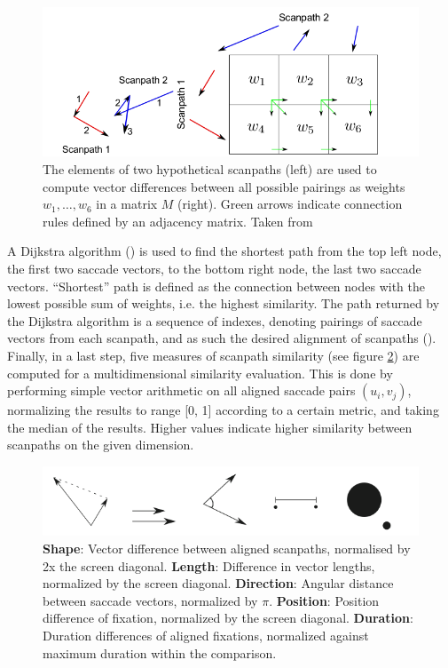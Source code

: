 \documentclass[a4paper, 12pt]{scrreprt}
\begin{document}
{\begin{figure}
	\includegraphics[scale=0.4]{img/weightedgraph.png}
	\caption[Scanpath alignment as a shortest-path problem.]
	{\small{The elements of two hypothetical scanpaths (left) are used to compute vector differences between all possible pairings as weights $w_1, \ldots, w_6$ in a matrix $M$ (right). Green arrows indicate connection rules defined by an adjacency matrix. Taken from \textcite{jarodzka2010vector}}}
	\label{fig:directedgraph}
\end{figure}

A Dijkstra algorithm (\cite{dijkstra1959note}) is used to find the shortest path from the top left node, the first two saccade vectors, to the bottom right node, the last two saccade vectors. “Shortest” path is defined as the connection between nodes with the lowest possible sum of weights, i.e. the highest similarity. The path returned by the Dijkstra algorithm is a sequence of indexes, denoting pairings of saccade vectors from each scanpath, and as such the desired alignment of scanpaths (\cite{dewhurst2012depends}).  Finally, in a last step, five measures of scanpath similarity (see figure \ref{fig:simmeasures}) are computed for a multidimensional similarity evaluation. This is done by performing simple vector arithmetic on all aligned saccade pairs $(u_i, v_j)$, normalizing the results to range [0, 1] according to a certain metric, and taking the median of the results. Higher values indicate higher similarity between scanpaths on the given dimension. \newline

\begin{figure}[H]
	\includegraphics[scale=0.5]{img/simmeasures.png}
	\caption[Similarity measures]{\small{\textbf{Shape}: Vector difference between aligned scanpaths, normalised by 2x the screen diagonal. \textbf{Length}: Difference in vector lengths, normalized by the screen diagonal. \textbf{Direction}: Angular distance between saccade vectors, normalized by $\pi$. \textbf{Position}: Position difference of fixation, normalized by the screen diagonal. \textbf{Duration}: Duration differences of aligned fixations, normalized against maximum duration within the comparison.}}
	\label{fig:simmeasures}
\end{figure}


}
\end{document}
